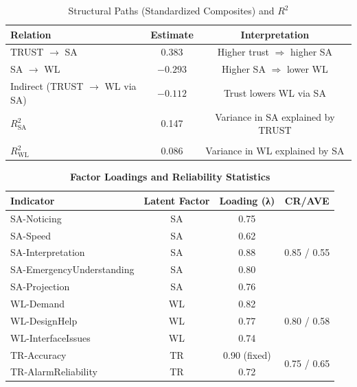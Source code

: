 \documentclass[conference]{IEEEtran}
\begin{document}
\begin{table}[h]
\centering
\caption{Structural Paths (Standardized Composites) and $R^2$}
\begin{tabular}{lcc}
\toprule
Relation & Estimate & Interpretation \\
\midrule
TRUST $\rightarrow$ SA & 0.383 & Higher trust $\Rightarrow$ higher SA \\

SA $\rightarrow$ WL    & $-0.293$ & Higher SA $\Rightarrow$ lower WL \\

Indirect (TRUST $\rightarrow$ WL via SA) & $-0.112$ & Trust lowers WL via SA \\

$R^2_{\text{SA}}$ & 0.147 & Variance in SA explained by TRUST \\
\\
$R^2_{\text{WL}}$ & 0.086 & Variance in WL explained by SA \\
\bottomrule
\end{tabular}
\end{table}
\begin{table}[h]

                   \caption{\textbf{Factor Loadings and Reliability Statistics}}

\begin{tabular}{lccc}

\toprule
Indicator & Latent Factor & Loading (\textbf{λ}) & CR/AVE \\

\midrule
SA-Noticing & SA & 0.75 
& \multirow{5}{*}{0.85 / 0.55} \\

SA-Speed & SA & 0.62 & \\

SA-Interpretation & SA & 0.88 & \\

SA-EmergencyUnderstanding & SA & 0.80 & \\

SA-Projection & SA & 0.76 & \\

WL-Demand & WL & 0.82 & \multirow{3}{*}{0.80 / 0.58} \\

WL-DesignHelp & WL & 0.77 & \\

WL-InterfaceIssues & WL & 0.74 & \\

TR-Accuracy & TR & 0.90 (fixed) & \multirow{2}{*}{0.75 / 0.65} \\
TR-AlarmReliability & TR & 0.72 & \\
\bottomrule
\end{tabular}
\end{table}
\end{document}
